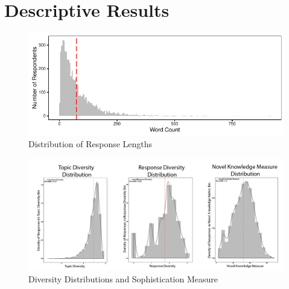 \documentclass[12pt]{article}
\begin{document}
\section{Descriptive Results}


\begin{figure}\centering
\includegraphics{../fig/wc.pdf}
\caption{Distribution of Response Lengths}
\end{figure}

\begin{figure}
\includegraphics[width=\textwidth]{../fig/diversity_distributions.png}
\caption{Diversity Distributions and Sophistication Measure}
\end{figure}
\end{document}
